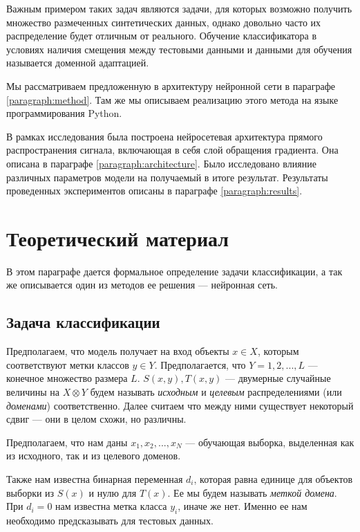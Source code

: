 \documentclass[14pt, a4paper]{extarticle}
\begin{document}
Важным примером таких задач являются задачи, для которых возможно получить множество размеченных синтетических данных, однако довольно часто их распределение будет отличным от реального. Обучение классификатора в условиях наличия смещения между тестовыми данными и данными для обучения называется доменной адаптацией.

Мы рассматриваем предложенную в \cite{ganin} архитектуру нейронной сети в параграфе \ref{paragraph:method}. Там же мы описываем реализацию этого метода на языке программирования Python.

В рамках исследования была построена нейросетевая архитектура прямого распространения сигнала, включающая в себя слой обращения градиента. Она описана в параграфе \ref{paragraph:architecture}. Было исследовано влияние различных параметров модели на получаемый в итоге результат. Результаты проведенных экспериментов описаны в параграфе \ref{paragraph:results}.

\newpage
\section{Теоретический материал}
\label{paragraph:theory}

В этом параграфе дается формальное определение задачи классификации, а так же описывается один из методов ее решения — нейронная сеть.

\subsection{Задача классификации}
\label{class_task}

Предполагаем, что модель получает на вход объекты $x \in X$, которым соответствуют метки классов $y \in Y$. Предполагается, что $Y = {1, 2, ..., L}$ — конечное множество размера $L$. $S(x,y), T(x,y)$ — двумерные случайные величины на $X \otimes Y$ будем называть \textit{исходным} и \textit{целевым} распределениями (или \textit{доменами}) соответственно. Далее считаем что между ними существует некоторый сдвиг — они в целом схожи, но различны.

Предполагаем, что нам даны ${x_1, x_2, ..., x_N}$ — обучающая выборка, выделенная как из исходного, так и из целевого доменов.

Также нам известна бинарная переменная $d_i$, которая равна единице для объектов выборки из $S(x)$ и нулю для $T(x)$. Ее мы будем называть \textit{меткой домена}. При $d_i = 0$ нам известна метка класса $y_i$, иначе же нет. Именно ее нам необходимо предсказывать для тестовых данных.
 
\end{document}
